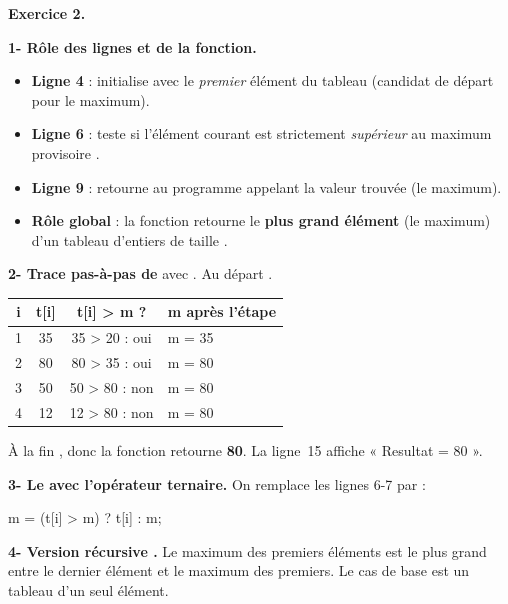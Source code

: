 \bigskip
\textbf{Exercice 2.}

\smallskip
\textbf{1- Rôle des lignes et de la fonction.}
\begin{itemize}
\item \textbf{Ligne 4} :  initialise  avec le \emph{premier}
élément du tableau (candidat de départ pour le maximum).
\item \textbf{Ligne 6} :  teste si l'élément courant est strictement
\emph{supérieur} au maximum provisoire .
\item \textbf{Ligne 9} :  retourne au programme appelant la valeur trouvée
(le maximum).
\item \textbf{Rôle global} : la fonction  retourne le \textbf{plus grand
élément} (le maximum) d'un tableau d'entiers de taille .
\end{itemize}

\textbf{2- Trace pas-à-pas de } avec
. Au départ .

\begin{center}\small
\begin{tabular}{@{}cccl@{}}
\toprule
\textbf{i} & \textbf{t[i]} & \textbf{t[i] > m ?} & \textbf{m après l'étape}\\
\midrule
1 & 35 & 35 > 20 \;: oui  & m = 35\\
2 & 80 & 80 > 35 \;: oui  & m = 80\\
3 & 50 & 50 > 80 \;: non  & m = 80\\
4 & 12 & 12 > 80 \;: non  & m = 80\\
\bottomrule
\end{tabular}
\end{center}

À la fin , donc la fonction retourne \textbf{80}. La ligne~15 affiche
« Resultat = 80 ».

\textbf{3- Le  avec l'opérateur ternaire.} On remplace les lignes 6-7 par :

\begin{codec}
m = (t[i] > m) ? t[i] : m;
\end{codec}

\textbf{4- Version récursive .} Le maximum des  premiers éléments est
le plus grand entre le dernier élément  et le maximum des  premiers.
Le cas de base est un tableau d'un seul élément.

